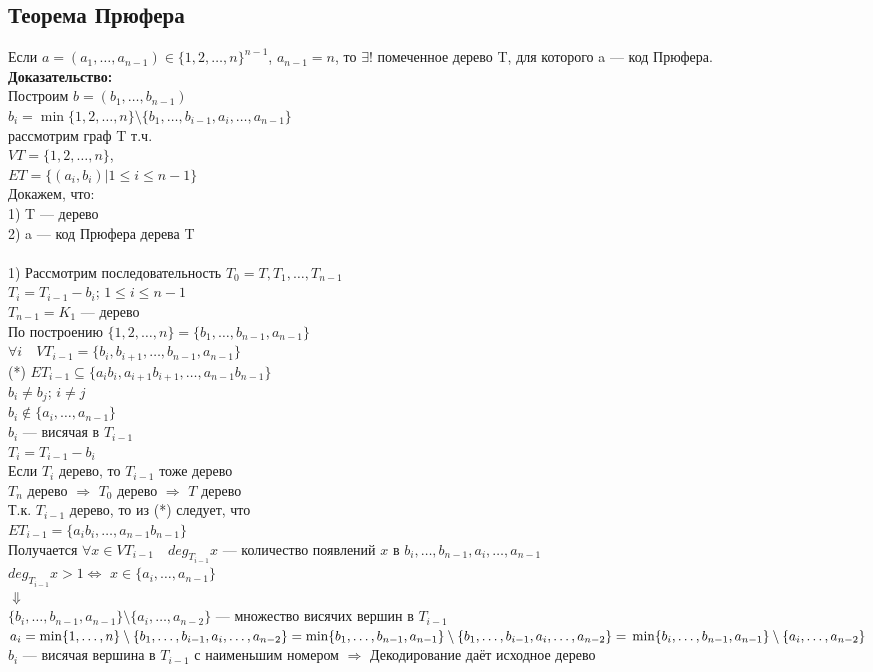 \documentclass[12pt]{article}
\begin{document}
	\subsection{Теорема Прюфера}
		Если $a = (a_1,\dotsc,a_{n-1}) \in \{1,2,\dotsc,n\}^{n-1}$, $a_{n-1} = n$, то $\exists!$ помеченное дерево T, для которого a — код Прюфера.\\
		\textbf{Доказательство:}\\
			Построим $b = (b_1,\dotsc,b_{n-1})$\\
			$b_i = \min\{1,2,\dotsc,n\}\setminus\{b_1,\dotsc,b_{i-1},a_i,\dotsc,a_{n-1}\}$\\
			рассмотрим граф T т.ч.\\
			$VT = \{1,2,\dotsc,n\}$,\\
			$ET = \{(a_i,b_i)|1\leqslant i \leqslant n-1\}$\\
			Докажем, что:\\
			1) T — дерево\\
			2) a — код Прюфера дерева T\\\\
			1) Рассмотрим последовательность $T_0 = T,T_1,\dotsc,T_{n-1}$\\
			$T_i = T_{i-1} - b_i$; $1 \leqslant i \leqslant n-1$\\
			$T_{n-1} = K_1$ — дерево\\
			По построению $\{1,2,\dotsc,n\} = \{b_1,\dotsc,b_{n-1},a_{n-1}\}$\\
			$\forall i \quad VT_{i-1} = \{b_i,b_{i+1},\dotsc,b_{n-1},a_{n-1}\}$\\
			(*) $ET_{i-1} \subseteq \{a_ib_i,a_{i+1}b_{i+1},\dotsc,a_{n-1}b_{n-1}\}$\\
			$b_i \neq b_j$; \quad $i \neq j$\\
			$b_i \notin \{a_i,\dotsc,a_{n-1}\}$\\
			$b_i$ — висячая в $T_{i-1}$\\
			$T_{i} = T_{i-1} - b_i$\\
			Если $T_i$ дерево, то $T_{i-1}$ тоже дерево\\
			$T_n$ дерево $\Rightarrow$ $T_0$ дерево $\Rightarrow$ $T$ дерево\\
			Т.к. $T_{i-1}$ дерево, то из (*) следует, что\\
			$ET_{i-1} = \{a_ib_i,\dotsc,a_{n-1}b_{n-1}\}$\\
			Получается $\forall x \in VT_{i-1} \quad deg_{T_{i-1}}x$ — количество появлений $x$ в $b_i,\dotsc,b_{n-1},a_i,\dotsc,a_{n-1}$\\
			$deg_{T_{i-1}}x > 1 \Leftrightarrow$ $x \in\{a_i,\dotsc,a_{n-1}\}$\\
			$\Downarrow$\\
			$\{b_i,\dotsc,b_{n-1},a_{n-1}\}\setminus\{a_i,\dotsc,a_{n-2}\}$ — множество висячих вершин в $T_{i-1}$\\
			$a_i = \min\{1,\dotsc,n\}\setminus\{b_1,\dotsc,b_{i-1},a_i,\dotsc,a_{n-2}\} = \min\{b_1,\dotsc,b_{n-1},a_{n-1}\}\setminus\{b_1,\dotsc,b_{i-1},a_i,\dots,a_{n-2}\} =\\ \min\{b_i,\dotsc,b_{n-1},a_{n-1}\}\setminus\{a_i,\dotsc,a_{n-2}\}$\\
			$b_i$ — висячая вершина в $T_{i-1}$ с наименьшим номером $\Rightarrow$ Декодирование даёт исходное дерево\\
		\qedsymbol
\end{document}

